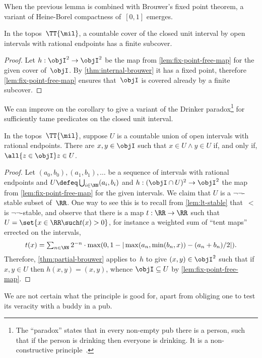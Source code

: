 When the previous lemma is combined with Brouwer's fixed point theorem, a variant of Heine-Borel compactness of~$[0,1]$ emerges.

\begin{corollary}
  In the topos~$\TT{\mil}$, a countable cover of the closed unit interval by open intervals with rational endpoints has a finite subcover.
\end{corollary}

\begin{proof}
  Let $h : \objI^2 \to \objI^2$ be the map from \cref{lem:fix-point-free-map} for the given cover of~$\objI$.
  By \cref{thm:internal-brouwer} it has a fixed point, therefore \cref{lem:fix-point-free-map} ensures that~$\objI$ is covered already by a finite subcover.
\end{proof}

We can improve on the corollary to give a variant of the Drinker paradox\footnote{The ``paradox'' states that in every non-empty pub there is a person, such that if the person is drinking then everyone is drinking. It is a non-constructive principle~\cite{warren2018drinker}.} for sufficiently tame predicates on the closed unit interval.

\begin{proposition}
  \label{prop:drinking-buddies}%
  In the topos~$\TT{\mil}$, suppose $U$ is a countable union of open intervals with rational endpoints.
  There are $x, y \in \objI$ such that $x \in U \land y \in U$ if, and only if, $\all{z \in \objI} z \in U$.
\end{proposition}

\begin{proof}
  Let $(a_0, b_0), (a_1, b_1), \ldots$ be a sequence of intervals with rational endpoints and $U \defeq \bigcup_{i \in \NN} (a_i, b_i)$ and $h : (\objI \cap U)^2 \to \objI^2$ the map from \cref{lem:fix-point-free-map} for the given intervals. We claim that $U$ is a $\neg\neg$-stable subset of~$\RR$. One way to see this is to recall from \cref{lem:lt-stable} that~$<$ is $\neg\neg$-stable, and observe that there is a map $t : \RR \to \RR$ such that $U = \set{x \in \RR \such t(x) > 0}$, for instance a weighted sum of “tent maps” errected on the intervals,
  \begin{equation*}
    \textstyle
    t(x) = \sum_{n \in \NN} 2^{-n} \cdot \max (0, 1 - |\max (a_n, \min (b_n, x)) - (a_n + b_n)/2|).
  \end{equation*}
  Therefore, \cref{thm:partial-brouwer} applies to~$h$ to give $(x, y) \in \objI^2$ such that if $x, y \in U$ then $h(x,y) = (x,y)$, whence $\objI \subseteq U$ by \cref{lem:fix-point-free-map}.
\end{proof}

We are not certain what the principle is good for, apart from obliging one to test its veracity with a buddy in a pub.

